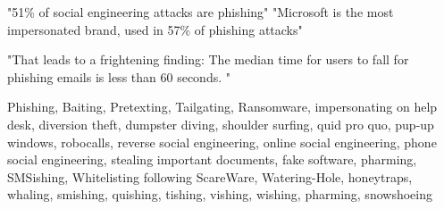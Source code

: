 "51\% of social engineering attacks are phishing"\cite{3_barracuda}
"Microsoft is the most impersonated brand, used in 57\% of phishing attacks"\cite{3_barracuda}

"That leads to a frightening
finding: The median time for
users to fall for phishing emails
is less than 60 seconds. "\cite{8_verizon}

Phishing, Baiting, Pretexting, Tailgating, Ransomware, impersonating on help desk, diversion theft, dumpster diving,
shoulder surfing, quid pro quo, pup-up windows, robocalls, reverse social engineering, online social engineering, phone social engineering,
stealing important documents, fake software, pharming, SMSishing, Whitelisting following
ScareWare, Watering-Hole, honeytraps, whaling, smishing, quishing, tishing, vishing, wishing, pharming, snowshoeing


